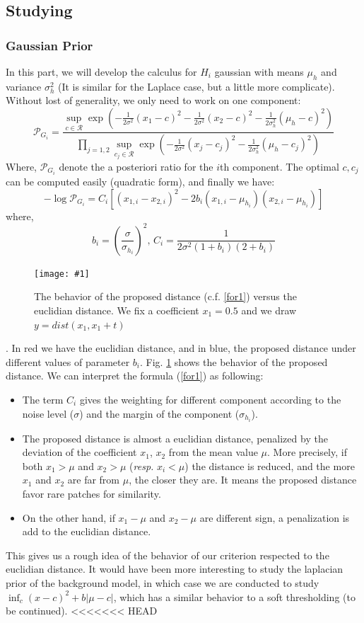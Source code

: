 \documentclass[runningheads]{llncs}
\newcommand{\insertF}[4]{
  \begin{figure}[h!]
    \centering
    \begin{minipage}{#3\linewidth}
    \texttt{[image: \#1]}
    \end{minipage}  
      \caption{#2}
      \label{#4}
  \end{figure}  
}
\newcommand{\wdist}[3]{\frac{1}{2#3}(#1-#2 )^2}
\begin{document}
\subsection{Studying}
\subsubsection{Gaussian Prior}
In this part, we will develop the calculus for $H_i$ gaussian with means $\mu_h$ and variance $\sigma_h^2$ (It is similar for the Laplace case, but a little more complicate). Without lost of generality, we only need to work on one component:
\[
 \mathcal{P}_{G_i} = \frac{\sup_{c\in \mathcal{R}} \exp(-\wdist{x_1}{c}{\sigma^2}-\wdist{x_2}{c}{\sigma^2}-\wdist{\mu_h}{c}{\sigma_h^2}) }
{\prod_{j=1,2}\sup_{c_j\in \mathcal{R}} \exp(-\frac{1}{2\sigma^2}(x_j-c_j )^2-\wdist{\mu_h}{c_j}{\sigma_h^2})  }
\]
Where, $\mathcal{P}_{G_i}$ denote the a posteriori ratio for the $i$th component. The optimal $c, c_j$ can be computed easily (quadratic form), and finally we have:
\begin{equation}
 -\log \mathcal{P}_{G_i}= C_i [ (x_{1,i}-x_{2,i})^2 -2b_i(x_{1,i}-\mu_{h_i})(x_{2,i}-\mu_{h_i})]
 \label{for1}
\end{equation}
where,
\[b_i=(\frac{\sigma}{\sigma_{h_i}})^2\text{, }C_i=\frac{1}{2\sigma^2(1+b_i)(2+b_i)}\]
\insertF{curve}{The behavior of the proposed distance (c.f. \ref{for1}) versus the euclidian distance. We fix a coefficient $x_1=0.5$ and we draw $y=dist(x_1,x_1+t)$}{0.8}{curv}. In red we have the euclidian distance, and in blue, the proposed distance under different values of parameter $b_i$.
Fig. \ref{curv} shows the behavior of the proposed distance. We can interpret the formula (\ref{for1}) as following:
\begin{itemize}
 \item The term $C_i$ gives the weighting for different component according to the noise level ($\sigma$) and the margin of the component ($\sigma_{h_i}$).
 \item The proposed distance is almost a euclidian distance, penalized by the deviation of the coefficient $x_1$, $x_2$ from the mean value $\mu$. More precisely, if both $x_1>\mu$ and $x_2>\mu$ (\textit{resp.} $x_i<\mu$) the distance is reduced, and the more $x_1$ and $x_2$ are far from $\mu$, the closer they are. It means the proposed distance favor rare patches for similarity.
 \item On the other hand, if $x_1-\mu$ and $x_2-\mu$ are different sign, a penalization is add to the euclidian distance. 
\end{itemize}
This gives us a rough idea of the behavior of our criterion respected to the euclidian distance. It would have been more interesting to study the laplacian prior of the background model, in which case we are conducted to study $\inf_c (x-c)^2+b|\mu-c|$, which has a similar behavior to a soft thresholding (to be continued). 
<<<<<<< HEAD
\end{document}
